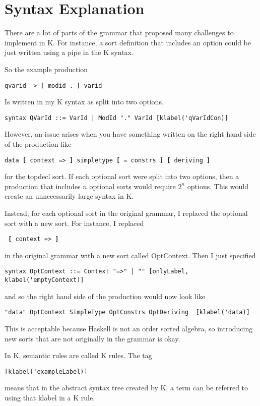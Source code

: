 \section{Syntax Explanation}
There are a lot of parts of the grammar that proposed many challenges to implement in K. For instance, a sort definition that includes an option could be just written using a pipe
in the K syntax.

So the example production

\texttt{qvarid -> \textbf{[} modid . \textbf{]} varid}

Is written in my K syntax as split into two options.
\begin{lstlisting}
syntax QVarId ::= VarId | ModId "." VarId [klabel('qVarIdCon)]
\end{lstlisting}
However, an issue arises when you have something written on the right hand side of the production like

\texttt{data \textbf{[} context => \textbf{]} simpletype \textbf{[} = constrs \textbf{]} \textbf{[} deriving \textbf{]}}

for the topdecl sort. If each optional sort were split into two options, then a production that includes $n$ optional sorts would require $2^n$ options. This would create an unnecessarily large syntax in K.

Instead, for each optional sort in the original grammar, I replaced the optional sort with a new sort. For instance, I replaced

\texttt{ \textbf{[} context => \textbf{]} }

in the original grammar with a new sort called OptContext. Then I just specified
\begin{lstlisting}
syntax OptContext ::= Context "=>" | "" [onlyLabel, klabel('emptyContext)]
\end{lstlisting}
and so the right hand side of the production would now look like
\begin{lstlisting}
"data" OptContext SimpleType OptConstrs OptDeriving  [klabel('data)]
\end{lstlisting}
This is acceptable because Haskell is not an order sorted algebra, so introducing new sorts that are not originally in the grammar is okay.

In K, semantic rules are called K rules. The tag
\begin{lstlisting}
[klabel('exampleLabel)]
\end{lstlisting}
means that in the abstract syntax tree created by K, a term can be referred to using that klabel in a K rule.

